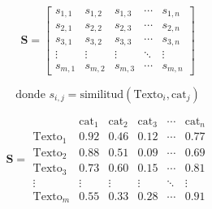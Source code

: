 \documentclass[preview]{standalone}
\begin{document}
	
	\[
	\mathbf{S} =
	\begin{bmatrix}
		s_{1,1} & s_{1,2} & s_{1,3} & \cdots & s_{1,n} \\
		s_{2,1} & s_{2,2} & s_{2,3} & \cdots & s_{2,n} \\
		s_{3,1} & s_{3,2} & s_{3,3} & \cdots & s_{3,n} \\
		\vdots  & \vdots  & \vdots  & \ddots & \vdots  \\
		s_{m,1} & s_{m,2} & s_{m,3} & \cdots & s_{m,n}
	\end{bmatrix}
	\]
	
	\[
	\text{donde } s_{i,j} = \text{similitud}( \text{Texto}_i, \text{cat}_j )
	\]
	
	\hspace{1cm}
	
	\[
	\mathbf{S} =
	\begin{array}{c|ccccc}
		& \text{cat}_1 & \text{cat}_2 & \text{cat}_3 & \cdots & \text{cat}_n \\ \hline
		\text{Texto}_1 & 0.92 & 0.46 & 0.12 & \cdots & 0.77 \\
		\text{Texto}_2 & 0.88 & 0.51 & 0.09 & \cdots & 0.69 \\
		\text{Texto}_3 & 0.73 & 0.60 & 0.15 & \cdots & 0.81 \\
		\vdots         & \vdots & \vdots & \vdots & \ddots & \vdots \\
		\text{Texto}_m & 0.55 & 0.33 & 0.28 & \cdots & 0.91
	\end{array}
	\]
	
\end{document}
